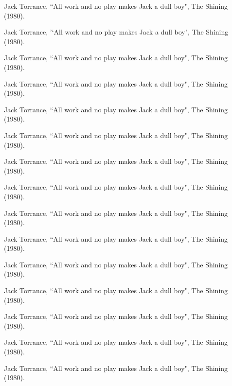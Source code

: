 	\item Jack Torrance, ``All work and no play makes Jack a dull boy", The Shining (1980).
	\item \hspace{5mm}Jack Torrance, '`All work and no play makes Jack a dull boy", The Shining (1980).
	\item \hspace{10mm}Jack Torrance, ``All work and no play makes Jack a dull boy", The Shining (1980).
	\item \hspace{15mm}Jack Torrance, ``All work and no play makes Jack a dull boy", The Shining (1980).
	\item \hspace{20mm}Jack Torrance, ``All work and no play makes Jack a dull boy", The Shining (1980).
	\item \hspace{25mm}Jack Torrance, ``All work and no play makes Jack a dull boy", The Shining (1980).
	\item \hspace{30mm}Jack Torrance, ``All work and no play makes Jack a dull boy", The Shining (1980).
	\item \hspace{25mm}Jack Torrance, ``All work and no play makes Jack a dull boy", The Shining (1980).
	\item \hspace{20mm}Jack Torrance, ``All work and no play makes Jack a dull boy", The Shining (1980).
	\item \hspace{15mm}Jack Torrance, ``All work and no play makes Jack a dull boy", The Shining (1980).
	\item \hspace{10mm}Jack Torrance, ``All work and no play makes Jack a dull boy", The Shining (1980).
	\item \hspace{5mm}Jack Torrance, ``All work and no play makes Jack a dull boy", The Shining (1980).
	\item Jack Torrance, ``All work and no play makes Jack a dull boy", The Shining (1980).
	\item \hspace{5mm}Jack Torrance, ``All work and no play makes Jack a dull boy", The Shining (1980).
	\item \hspace{10mm}Jack Torrance, ``All work and no play makes Jack a dull boy", The Shining (1980).
